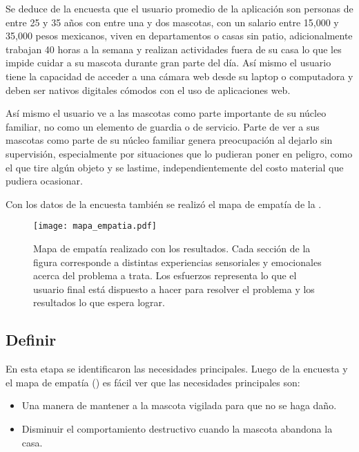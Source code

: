 \documentclass[12pt,a4paper]{proyectoinnovacion}
\begin{document}
Se deduce de la encuesta que el usuario promedio de la aplicación son personas de entre 25 y 35 años con entre una y dos mascotas, con un salario entre 15,000 y 35,000 pesos mexicanos, viven en departamentos o casas sin patio, adicionalmente trabajan 40 horas a la semana y realizan actividades fuera de su casa lo que les impide cuidar a su mascota durante gran parte del día. Así mismo el usuario tiene la capacidad de acceder a una cámara web desde su laptop o computadora y deben ser nativos digitales cómodos con el uso de aplicaciones web.

Así mismo el usuario ve a las mascotas como parte importante de su núcleo familiar, no como un elemento de guardia o de servicio. Parte de ver a sus mascotas como parte de su núcleo familiar genera preocupación al dejarlo sin supervisión, especialmente por situaciones que lo pudieran poner en peligro, como el que tire algún objeto y se lastime, independientemente del costo material que pudiera ocasionar.

Con los datos de la encuesta también se realizó el mapa de empatía de la . 


\begin{landscape}
  \begin{figure}
      \label{fig:mapaempatia}
      \centering
      \caption[Mapa de empatía del proyecto.]{Mapa de empatía realizado con los resultados. Cada sección de la figura corresponde a distintas experiencias sensoriales y emocionales acerca del problema a trata. Los esfuerzos representa lo que el usuario final está dispuesto a hacer para resolver el problema y los resultados lo que espera lograr.}
      \texttt{[image: mapa\_empatia.pdf]}
  \end{figure}
\end{landscape}

\subsection{Definir}
\label{sec:definir}

En esta etapa se identificaron las necesidades principales. Luego de la encuesta y el mapa de empatía () es fácil ver que las necesidades principales son:


\begin{itemize}
  \item Una manera de mantener a la mascota vigilada para que no se haga daño.\item Disminuir el comportamiento destructivo cuando la mascota abandona la casa.
\end{itemize}
\end{document}
